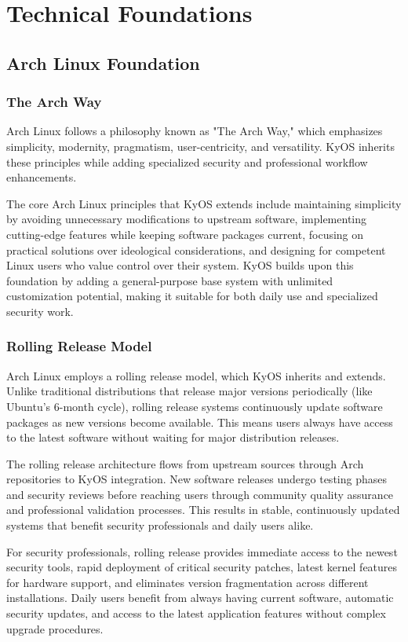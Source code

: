 \documentclass[12pt,a4paper]{article}
\begin{document}
\section{Technical Foundations}

\subsection{Arch Linux Foundation}

\subsubsection{The Arch Way}
Arch Linux follows a philosophy known as "The Arch Way," which emphasizes simplicity, modernity, pragmatism, user-centricity, and versatility. KyOS inherits these principles while adding specialized security and professional workflow enhancements.

The core Arch Linux principles that KyOS extends include maintaining simplicity by avoiding unnecessary modifications to upstream software, implementing cutting-edge features while keeping software packages current, focusing on practical solutions over ideological considerations, and designing for competent Linux users who value control over their system. KyOS builds upon this foundation by adding a general-purpose base system with unlimited customization potential, making it suitable for both daily use and specialized security work.

\subsubsection{Rolling Release Model}
Arch Linux employs a rolling release model, which KyOS inherits and extends. Unlike traditional distributions that release major versions periodically (like Ubuntu's 6-month cycle), rolling release systems continuously update software packages as new versions become available. This means users always have access to the latest software without waiting for major distribution releases.

The rolling release architecture flows from upstream sources through Arch repositories to KyOS integration. New software releases undergo testing phases and security reviews before reaching users through community quality assurance and professional validation processes. This results in stable, continuously updated systems that benefit security professionals and daily users alike.

For security professionals, rolling release provides immediate access to the newest security tools, rapid deployment of critical security patches, latest kernel features for hardware support, and eliminates version fragmentation across different installations. Daily users benefit from always having current software, automatic security updates, and access to the latest application features without complex upgrade procedures.
\end{document}
